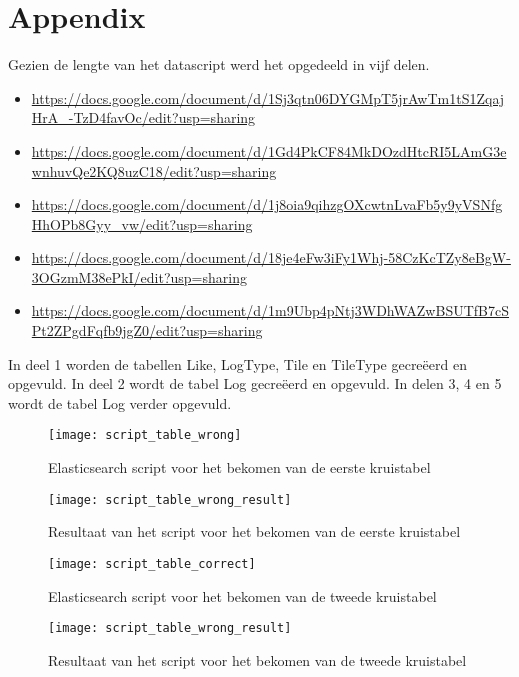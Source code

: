 \chapter{Appendix}
\label{ch:appendix}

Gezien de lengte van het datascript werd het opgedeeld in vijf delen.

\begin{itemize}
	\label{app:datascript}
	\item \url{https://docs.google.com/document/d/1Sj3qtn06DYGMpT5jrAwTm1tS1ZqajHrA_-TzD4favOc/edit?usp=sharing}
	\item \url{https://docs.google.com/document/d/1Gd4PkCF84MkDOzdHtcRI5LAmG3ewnhuvQe2KQ8uzC18/edit?usp=sharing}
	\item \url{https://docs.google.com/document/d/1j8oia9qihzgOXcwtnLvaFb5y9yVSNfgHhOPb8Gyy_vw/edit?usp=sharing}
	\item \url{https://docs.google.com/document/d/18je4eFw3iFy1Whj-58CzKcTZy8eBgW-3OGzmM38ePkI/edit?usp=sharing}
	\item \url{https://docs.google.com/document/d/1m9Ubp4pNtj3WDhWAZwBSUTfB7cSPt2ZPgdFqfb9jgZ0/edit?usp=sharing}
\end{itemize}

In deel 1 worden de tabellen Like, LogType, Tile en TileType gecreëerd en opgevuld.
In deel 2 wordt de tabel Log gecreëerd en opgevuld.
In delen 3, 4 en 5 wordt de tabel Log verder opgevuld.

\begin{figure}
	\centering
	\texttt{[image: script\_table\_wrong]}
	\caption{Elasticsearch script voor het bekomen van de eerste kruistabel}
	\label{app:eersteKruistabel}
\end{figure}

\begin{figure}
	\centering
	\texttt{[image: script\_table\_wrong\_result]}
	\caption{Resultaat van het script voor het bekomen van de eerste kruistabel}
	\label{app:eersteKruistabelResult}
\end{figure}

\begin{figure}
	\centering
	\texttt{[image: script\_table\_correct]}
	\caption{Elasticsearch script voor het bekomen van de tweede kruistabel}
	\label{app:tweedeKruistabel}
\end{figure}

\begin{figure}
	\centering
	\texttt{[image: script\_table\_wrong\_result]}
	\caption{Resultaat van het script voor het bekomen van de tweede kruistabel}
	\label{app:tweedeKruistabelResult}	
\end{figure}